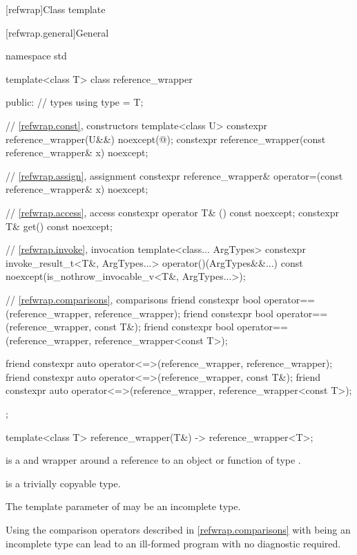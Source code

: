 [refwrap]{Class template }

[refwrap.general]{General}

%
%
\begin{codeblock}
namespace std {
  template<class T> class reference_wrapper {
  public:
    // types
    using type = T;

    // \ref{refwrap.const}, constructors
    template<class U>
      constexpr reference_wrapper(U&&) noexcept(@\seebelow@);
    constexpr reference_wrapper(const reference_wrapper& x) noexcept;

    // \ref{refwrap.assign}, assignment
    constexpr reference_wrapper& operator=(const reference_wrapper& x) noexcept;

    // \ref{refwrap.access}, access
    constexpr operator T& () const noexcept;
    constexpr T& get() const noexcept;

    // \ref{refwrap.invoke}, invocation
    template<class... ArgTypes>
      constexpr invoke_result_t<T&, ArgTypes...> operator()(ArgTypes&&...) const
        noexcept(is_nothrow_invocable_v<T&, ArgTypes...>);

    // \ref{refwrap.comparisons}, comparisons
    friend constexpr bool operator==(reference_wrapper, reference_wrapper);
    friend constexpr bool operator==(reference_wrapper, const T&);
    friend constexpr bool operator==(reference_wrapper, reference_wrapper<const T>);

    friend constexpr auto operator<=>(reference_wrapper, reference_wrapper);
    friend constexpr auto operator<=>(reference_wrapper, const T&);
    friend constexpr auto operator<=>(reference_wrapper, reference_wrapper<const T>);
  };

  template<class T>
    reference_wrapper(T&) -> reference_wrapper<T>;
}
\end{codeblock}

\pnum
{} is a  and  wrapper
around a reference to an object or function of type .

\pnum
{} is
a trivially copyable type.

\pnum
The template parameter  of 
may be an incomplete type.
\begin{note}
Using the comparison operators described in \ref{refwrap.comparisons}
with  being an incomplete type
can lead to an ill-formed program
with no diagnostic required.
\end{note}

